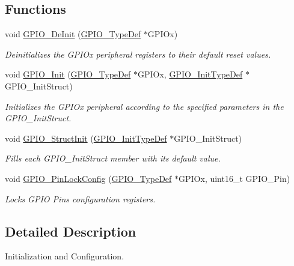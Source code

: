 \subsection*{Functions}
\begin{DoxyCompactItemize}
\item 
void \hyperlink{group___g_p_i_o___group1_gaa60bdf3182c44b5fa818f237042f52ee}{G\+P\+I\+O\+\_\+\+De\+Init} (\hyperlink{struct_g_p_i_o___type_def}{G\+P\+I\+O\+\_\+\+Type\+Def} $\ast$G\+P\+I\+Ox)
\begin{DoxyCompactList}\small\item\em Deinitializes the G\+P\+I\+Ox peripheral registers to their default reset values. \end{DoxyCompactList}\item 
void \hyperlink{group___g_p_i_o___group1_ga71abf9404261370d03cca449b88d3a65}{G\+P\+I\+O\+\_\+\+Init} (\hyperlink{struct_g_p_i_o___type_def}{G\+P\+I\+O\+\_\+\+Type\+Def} $\ast$G\+P\+I\+Ox, \hyperlink{struct_g_p_i_o___init_type_def}{G\+P\+I\+O\+\_\+\+Init\+Type\+Def} $\ast$G\+P\+I\+O\+\_\+\+Init\+Struct)
\begin{DoxyCompactList}\small\item\em Initializes the G\+P\+I\+Ox peripheral according to the specified parameters in the G\+P\+I\+O\+\_\+\+Init\+Struct. \end{DoxyCompactList}\item 
void \hyperlink{group___g_p_i_o___group1_gab28de41278e7f8c63d0851e2733b10df}{G\+P\+I\+O\+\_\+\+Struct\+Init} (\hyperlink{struct_g_p_i_o___init_type_def}{G\+P\+I\+O\+\_\+\+Init\+Type\+Def} $\ast$G\+P\+I\+O\+\_\+\+Init\+Struct)
\begin{DoxyCompactList}\small\item\em Fills each G\+P\+I\+O\+\_\+\+Init\+Struct member with its default value. \end{DoxyCompactList}\item 
void \hyperlink{group___g_p_i_o___group1_gad2f2e615928c69fd0d8c641a7cedaafc}{G\+P\+I\+O\+\_\+\+Pin\+Lock\+Config} (\hyperlink{struct_g_p_i_o___type_def}{G\+P\+I\+O\+\_\+\+Type\+Def} $\ast$G\+P\+I\+Ox, uint16\+\_\+t G\+P\+I\+O\+\_\+\+Pin)
\begin{DoxyCompactList}\small\item\em Locks G\+P\+IO Pins configuration registers. \end{DoxyCompactList}\end{DoxyCompactItemize}


\subsection{Detailed Description}
Initialization and Configuration. 

